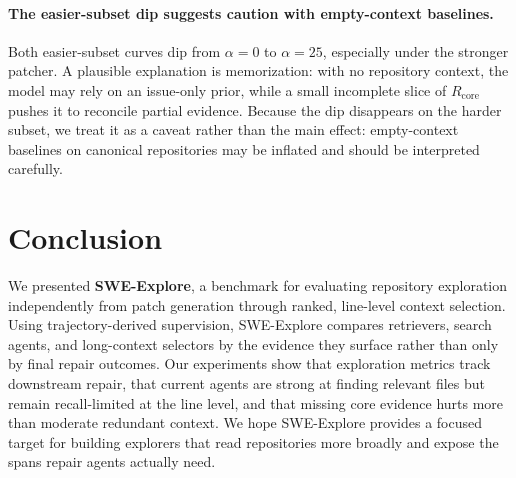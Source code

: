 \vspace{-3mm}
\paragraph{The easier-subset dip suggests caution with empty-context baselines.}
Both easier-subset curves dip from $\alpha{=}0$ to $\alpha{=}25$, especially under the stronger patcher. A plausible explanation is memorization: with no repository context, the model may rely on an issue-only prior, while a small incomplete slice of $R_{\text{core}}$ pushes it to reconcile partial evidence. Because the dip disappears on the harder subset, we treat it as a caveat rather than the main effect: empty-context baselines on canonical repositories may be inflated and should be interpreted carefully.


\section{Conclusion}

We presented \textbf{SWE-Explore}, a benchmark for evaluating repository exploration independently from patch generation through ranked, line-level context selection. Using trajectory-derived supervision, SWE-Explore compares retrievers, search agents, and long-context selectors by the evidence they surface rather than only by final repair outcomes. Our experiments show that exploration metrics track downstream repair, that current agents are strong at finding relevant files but remain recall-limited at the line level, and that missing core evidence hurts more than moderate redundant context. We hope SWE-Explore provides a focused target for building explorers that read repositories more broadly and expose the spans repair agents actually need.

